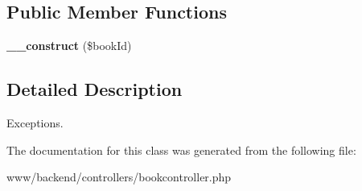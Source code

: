 \subsection*{Public Member Functions}
\begin{DoxyCompactItemize}
\item 
\hypertarget{classBookNotFoundException_a201a2ab14afb9d7ff1cd58280738c3ec}{
{\bfseries \_\-\_\-construct} (\$bookId)}
\label{classBookNotFoundException_a201a2ab14afb9d7ff1cd58280738c3ec}

\end{DoxyCompactItemize}


\subsection{Detailed Description}
Exceptions. 

The documentation for this class was generated from the following file:\begin{DoxyCompactItemize}
\item 
www/backend/controllers/bookcontroller.php\end{DoxyCompactItemize}
